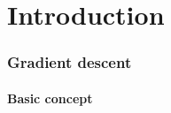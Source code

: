 \documentclass[9pt]{beamer}
\begin{document}
\section{Introduction}

\begin{frame}
  \frametitle{Gradient descent}

  \framesubtitle{Basic concept}

  \begin{center}
    \scalebox{0.8}{
      
    }
  \end{center}

\end{frame}













\end{document}
